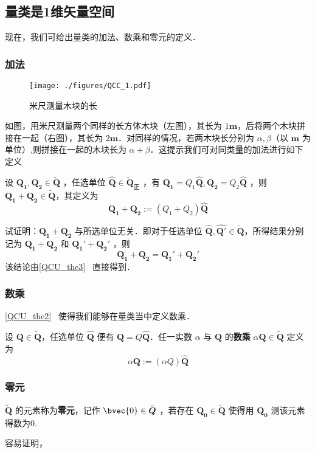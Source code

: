 \subsection{量类是1维矢量空间}
现在，我们可给出量类的加法、数乘和零元的定义．
\subsubsection{加法}
\begin{figure}[ht]
\centering
\texttt{[image: ./figures/QCC\_1.pdf]}
\caption{米尺测量木块的长} \label{QCC_fig1}
\end{figure}
如图，用米尺测量两个同样的长方体木块（左图），其长为 $1\boldsymbol{m}$，后将两个木块拼接在一起（右图），其长为 $2\boldsymbol{m}$．对同样的情况，若两木块长分别为 $\alpha ,\beta$（以 $\boldsymbol{m}$ 为单位）,则拼接在一起的木块长为 $\alpha+\beta$．这提示我们可对同类量的加法进行如下定义
\begin{definition}{}
设 $\boldsymbol{Q_1},\boldsymbol{Q_2}\in \tilde{\boldsymbol{Q}}$ ，任选单位 $\hat{\boldsymbol{Q}}\in\tilde{\boldsymbol{Q}}_{\text{正}}$ ，有 $\boldsymbol{Q_1}=Q_1\hat{\boldsymbol{Q}}, \boldsymbol{Q_2}=Q_2\hat{\boldsymbol{Q}}$ ，则 $\boldsymbol{Q_1}+\boldsymbol{Q_2}\in\tilde{\boldsymbol{Q}}$，其定义为
\begin{equation}
\boldsymbol{Q_1}+\boldsymbol{Q_2}:=(Q_1+Q_2)\hat{\boldsymbol{Q}}
\end{equation}
\end{definition}
\begin{example}{}
试证明：$\boldsymbol{Q_1}+\boldsymbol{Q_2}$ 与所选单位无关．即对于任选单位 $\hat{\boldsymbol{Q}},\hat{\boldsymbol{Q'}}\in\tilde{\boldsymbol{Q}}$，所得结果分别记为 $\boldsymbol{Q_1}+\boldsymbol{Q_2}$ 和 $\boldsymbol{Q_1}'+\boldsymbol{Q_2}'$ ，则
\begin{equation}
\boldsymbol{Q_1}+\boldsymbol{Q_2} =\boldsymbol{Q_1}'+\boldsymbol{Q_2}'
\end{equation}
 该结论由\autoref{QCU_the3}~ 直接得到．
\end{example}
\subsubsection{数乘}
\autoref{QCU_the2}~ 使得我们能够在量类当中定义数乘．
\begin{definition}{}
设 $\boldsymbol{Q}\in\tilde{\boldsymbol{Q}}$，任选单位 $\hat{\boldsymbol{Q}}$ 便有 $\boldsymbol{Q}=Q\hat{\boldsymbol{Q}}$．任一实数 $\alpha$ 与 $\boldsymbol{Q}$ 的\textbf{数乘} $\alpha\boldsymbol{Q}\in\tilde{\boldsymbol{Q}}$ 定义为
\begin{equation}
\alpha\boldsymbol{Q}:=(\alpha Q)\hat{\boldsymbol{Q}}
\end{equation}
\end{definition}
\subsubsection{零元}
\begin{definition}{}
$\tilde{\boldsymbol{Q}}$ 的元素称为\textbf{零元}，记作 $\bvec{0}\in\tilde{\boldsymbol{Q}}$ ，若存在 $\boldsymbol{Q_0}\in\tilde{\boldsymbol{Q}}$ 使得用 $\boldsymbol{Q_0}$ 测该元素得数为0.
\end{definition}
容易证明，

